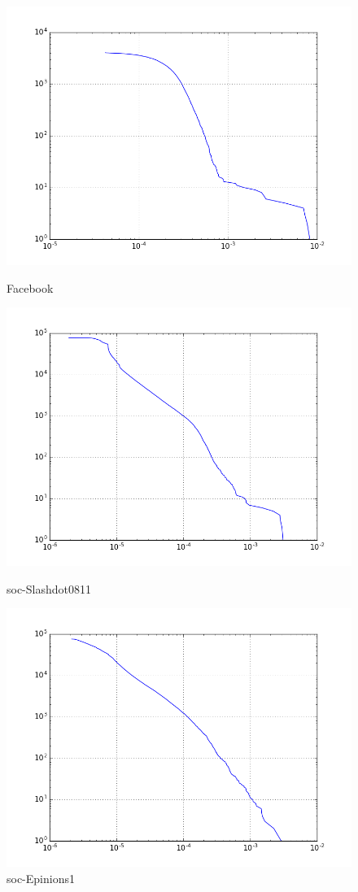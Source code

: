 \begin{figure}[H]
  \includegraphics[width=\linewidth]{img/facebook/pagerank_ccdf.png}
  \caption*{Facebook}
\endminipage\hfill
{}
  \includegraphics[width=\linewidth]{img/slashDot/pagerank_ccdf.png}
  \caption*{soc-Slashdot0811}
\endminipage\hfill
{}
  \includegraphics[width=\linewidth]{img/soc-E/pagerank_ccdf.png}
  \caption*{soc-Epinions1}
\endminipage
\end{figure}
